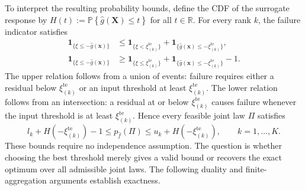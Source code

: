 \documentclass[review,11pt,3p,authoryear,nopreprintline]{elsarticle}
\begin{document}
To interpret the resulting probability bounds, define the CDF of the surrogate response by $H(t):=\mathbb P\left\{\hat g(\bm X)\le t\right\}$ for all $t\in\mathbb R$. For every rank $k$, the failure indicator satisfies 
\begin{align}
  \mathbf1_{\{\xi\le -\hat g(\bm x)\}}
  &\le
  \mathbf1_{\{\xi<\xi_{(k)}^{\mathrm{te}}\}}+\mathbf1_{\{\hat g(\bm x)\le-\xi_{(k)}^{\mathrm{te}}\}},
  \label{eq-upper-threshold-certificate}\\
  \mathbf1_{\{\xi\le -\hat g(\bm x)\}}
  &\ge
  \mathbf1_{\{\xi\le \xi_{(k)}^{\mathrm{te}}\}}+\mathbf1_{\{\hat g(\bm x)\le-\xi_{(k)}^{\mathrm{te}}\}}-1.
  \label{eq-lower-threshold-certificate}
\end{align}
The upper relation follows from a union of events: failure requires either a residual below $\xi_{(k)}^{\mathrm{te}}$ or an input threshold at least $\xi_{(k)}^{\mathrm{te}}$. The lower relation follows from an intersection: a residual at or below $\xi_{(k)}^{\mathrm{te}}$ causes failure whenever the input threshold is at least $\xi_{(k)}^{\mathrm{te}}$. Hence every feasible joint law $\Pi$ satisfies
\begin{equation}
  l_k+H\left(-\xi_{(k)}^{\mathrm{te}}\right)-1\le p_{\hat f}(\Pi)\le u_k+H\left(-\xi_{(k)}^{\mathrm{te}}\right),
  \qquad k=1,\ldots,K.
  \label{eq-rankwise-failure-bounds}
\end{equation}
These bounds require no independence assumption. The question is whether choosing the best threshold merely gives a valid bound or recovers the exact optimum over all admissible joint laws. The following duality and finite-aggregation arguments establish exactness.
\end{document}
